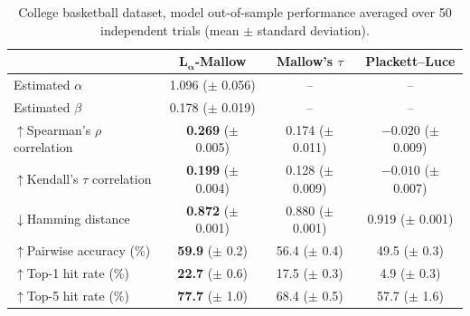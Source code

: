 \documentclass{article}
\begin{document}
\begin{table}[h!]
\centering
\setlength{\tabcolsep}{8pt}
\begin{tabular}{|l|c|c|c|}
\hline
 & \textbf{$\boldsymbol{L}_{\boldsymbol{\alpha}}$-Mallow} &  {Mallow's $\tau$} & {Plackett--Luce} \\
\hline
Estimated $\alpha$ & 1.096 \;($\pm$ 0.056) & -- & -- \\
Estimated $\beta$  & 0.178 \;($\pm$ 0.019) & -- & -- \\
\hline
$\uparrow$Spearman's $\rho$ correlation   & \textbf{0.269} \;($\pm$ 0.005) & 0.174 \;($\pm$ 0.011) & $-0.020$ \;($\pm$ 0.009) \\
$\uparrow$Kendall's $\tau$ correlation    & \textbf{0.199} \;($\pm$ 0.004) & 0.128 \;($\pm$ 0.009) & $-0.010$ \;($\pm$ 0.007) \\
$\downarrow$Hamming distance              & \textbf{0.872} \;($\pm$ 0.001) & 0.880 \;($\pm$ 0.001) & 0.919 \;($\pm$ 0.001) \\
$\uparrow$Pairwise accuracy (\%)          & \textbf{59.9} \;($\pm$ 0.2)    & 56.4 \;($\pm$ 0.4)    & 49.5 \;($\pm$ 0.3)    \\
$\uparrow$Top-1 hit rate (\%)             & \textbf{22.7} \;($\pm$ 0.6)    & 17.5 \;($\pm$ 0.3)    & 4.9  \;($\pm$ 0.3)    \\
$\uparrow$Top-5 hit rate (\%)             & \textbf{77.7} \;($\pm$ 1.0)    & 68.4 \;($\pm$ 0.5)    & 57.7 \;($\pm$ 1.6)    \\
\hline
\end{tabular}
\caption{College basketball dataset, model out-of-sample performance averaged over 50 independent trials (mean $\pm$ standard deviation).}
\label{tab:mle_comparison_basketball}
\end{table}
\end{document}
